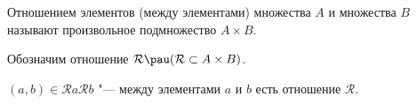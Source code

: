 
    Отношением элементов (между элементами) множества $A$ и множества $B$ называют произвольное подмножество $A\times B$.

    Обозначим отношение $\mathcal R\pau (\mathcal R\subset A\times B)$.

    $(a,b)\in \mathcal R$\qquad $a\mathcal Rb$ "--- между элементами $a$ и $b$ есть отношение $\mathcal R$.
